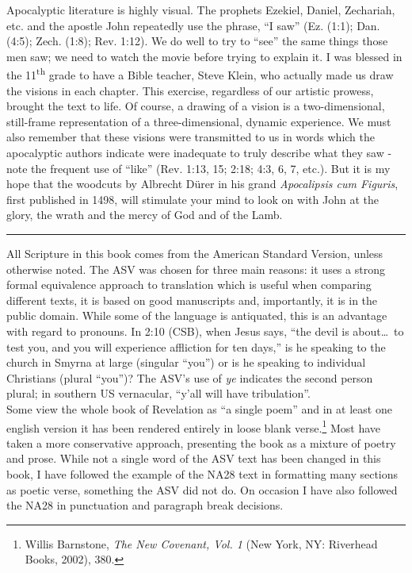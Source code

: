 Apocalyptic literature is highly visual. The prophets Ezekiel, Daniel, Zechariah, etc. and the apostle John repeatedly use the phrase, ``I saw'' (Ez. (1:1); Dan. (4:5); Zech. (1:8); Rev. 1:12). We do well to try to ``see'' the same things those men saw; we need to watch the movie before trying to explain it. I was blessed in the 11\textsuperscript{th} grade to have a Bible teacher, Steve Klein, who actually made us draw the visions in each chapter. This exercise, regardless of our artistic prowess, brought the text to life. Of course, a drawing of a vision is a two-dimensional, still-frame representation of a three-dimensional, dynamic experience. We must also remember that these visions were transmitted to us in words which the apocalyptic authors indicate were inadequate to truly describe what they saw - note the frequent use of ``like'' (Rev. 1:13, 15; 2:18; 4:3, 6, 7, etc.). But it is my hope that the woodcuts by Albrecht Dürer in his grand \textit{Apocalipsis cum Figuris}, first published in 1498, will stimulate your mind to look on with John at the glory, the wrath and the mercy of God and of the Lamb.\\
\fancybreak{* * *}
All Scripture in this book comes from the American Standard Version, unless otherwise noted. The \textsc{ASV} was chosen for three main reasons: it uses a strong formal equivalence approach to translation which is useful when comparing different texts, it is based on good manuscripts and, importantly, it is in the public domain. While some of the language is antiquated, this is an advantage with regard to pronouns. In 2:10 (\textsc{CSB}), when Jesus says, ``the devil is about\ldots\ to test you, and you will experience affliction for ten days,'' is he speaking to the church in Smyrna at large (singular ``you'') or is he speaking to individual Christians (plural ``you'')? The \textsc{ASV}'s use of \textit{ye} indicates the second person plural; in southern US vernacular, ``y'all will have tribulation''.\\

Some view the whole book of Revelation as ``a single poem'' and in at least one english version it has been rendered entirely in loose blank verse.\footnote{Willis Barnstone, \textit{The New Covenant, Vol. 1} (New York, NY: Riverhead Books, 2002), 380.} Most have taken a more conservative approach, presenting the book as a mixture of poetry and prose. While not a single word of the \textsc{ASV} text has been changed in this book, I have followed the example of the \textsc{NA28} text in formatting many sections as poetic verse, something the \textsc{ASV} did not do. On occasion I have also followed the \textsc{NA28} in punctuation and paragraph break decisions.\\

